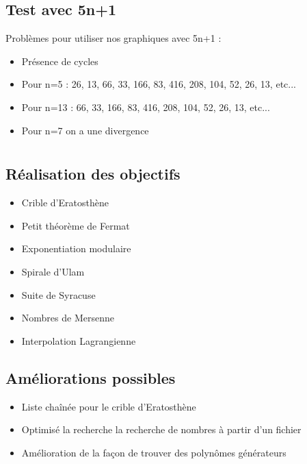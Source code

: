 \documentclass{beamer}
\begin{document}
\subsection{Test avec 5n+1}
\begin{frame}
Problèmes pour utiliser nos graphiques avec 5n+1 :
\begin{itemize}
\item Présence de cycles
\item Pour n=5 : 26, 13, 66, 33, 166, 83, 416, 208, 104, 52, 26, 13, etc...
\item Pour n=13 : 66, 33, 166, 83, 416, 208, 104, 52, 26, 13, etc...
\item Pour n=7 on a une divergence
\end{itemize}
\end{frame}

\section*{}
\subsection*{Réalisation des objectifs}
\begin{frame}
\begin{itemize}
\item Crible d'Eratosthène
\item Petit théorème de Fermat
\item Exponentiation modulaire
\item Spirale d'Ulam
\item Suite de Syracuse
\item Nombres de Mersenne
\item Interpolation Lagrangienne
\end{itemize}
\end{frame}

\subsection*{Améliorations possibles}
\begin{frame}
\begin{itemize}
\item Liste chaînée pour le crible d'Eratosthène
\item Optimisé la recherche la recherche de nombres à partir d'un fichier
\item Amélioration de la façon de trouver des polynômes générateurs
\end{itemize}
\end{frame}
\end{document}
